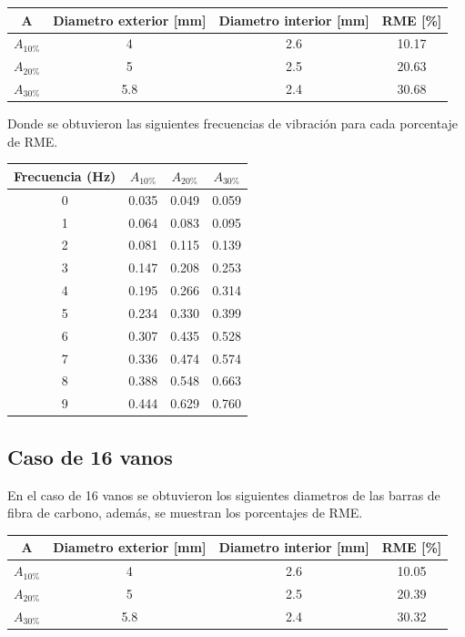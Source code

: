 \begin{table}[H]
    \centering
    \begin{tabular}{cccc}
    \toprule
     A & Diametro exterior [mm] & Diametro interior [mm] & RME [\%] \\
    \midrule
     $A_{10\%}$ &  4 &  2.6 &  10.17 \\
     $A_{20\%}$ &  5 &  2.5 &  20.63 \\
     $A_{30\%}$ &  5.8 &  2.4 &  30.68 \\
    \bottomrule
    \end{tabular}
\end{table}

Donde se obtuvieron las siguientes frecuencias de vibración para cada porcentaje de RME.

\begin{table}[H]
    \centering
    \begin{tabular}{cccc}
    \toprule
     Frecuencia (Hz) & $A_{10\%}$ & $A_{20\%}$ & $A_{30\%}$ \\
    \midrule
     0 &       0.035 &       0.049 &       0.059 \\
     1 &       0.064 &       0.083 &       0.095 \\
     2 &       0.081 &       0.115 &       0.139 \\
     3 &       0.147 &       0.208 &       0.253 \\
     4 &       0.195 &       0.266 &       0.314 \\
     5 &       0.234 &       0.330 &       0.399 \\
     6 &       0.307 &       0.435 &       0.528 \\
     7 &       0.336 &       0.474 &       0.574 \\
     8 &       0.388 &       0.548 &       0.663 \\
     9 &       0.444 &       0.629 &       0.760 \\
    \bottomrule
    \end{tabular}
\end{table}


\subsection{Caso de 16 vanos}
En el caso de 16 vanos se obtuvieron los siguientes diametros de las barras de fibra de carbono, además, se muestran los porcentajes de RME.

\begin{table}[H]
    \centering
    \begin{tabular}{cccc}
    \toprule
     A & Diametro exterior [mm] & Diametro interior [mm] & RME [\%] \\
    \midrule
     $A_{10\%}$ &  4 &  2.6 &  10.05 \\
     $A_{20\%}$ &  5 &  2.5 &  20.39 \\
     $A_{30\%}$ &  5.8 &  2.4 &  30.32 \\
    \bottomrule
    \end{tabular}
\end{table}

